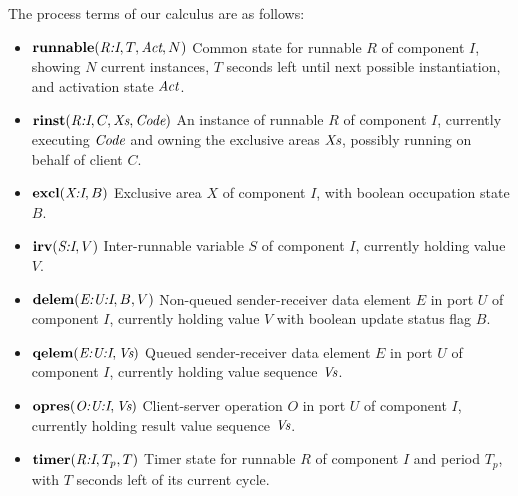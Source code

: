 \documentclass[twocolumn]{article}
\newcommand{\V}[1]{\text{\it #1}}
\newcommand{\Code} {\V{Code}}
\newcommand{\Act}  {\V{Act}}
\newcommand{\Xs}   {\V{Xs}}
\newcommand{\Vs}   {\V{Vs}}
\newcommand{\kw}[1]{\textbf{#1}}
\newcommand{\adr}[1]{\emph{#1}}
\newcommand{\runnable}[4]{\kw{runnable}(#1,#2,#3,#4)}
\newcommand{\rinst}   [4]{\kw{rinst}(#1,#2,#3,#4)}
\newcommand{\excl}    [2]{\kw{excl}(#1,#2)}
\newcommand{\irv}     [2]{\kw{irv}(#1,#2)}
\newcommand{\qelem}   [2]{\kw{qelem}(#1,#2)}
\newcommand{\delem}   [3]{\kw{delem}(#1,#2,#3)}
\newcommand{\opres}   [2]{\kw{opres}(#1,#2)}
\newcommand{\timer}   [3]{\kw{timer}(#1,#2, #3)}
\begin{document}
The process terms of our calculus are as follows:
\begin{itemize}
\item $\runnable{\adr{R:I}}{T}{\Act}{N}$  \newline
Common state for runnable $R$ of component $I$, showing $N$ current instances, $T$ seconds left until next possible instantiation, and activation state $\Act$.
\item $\rinst{\adr{R:I}}{C}{\Xs}{\Code}$ \newline
An instance of runnable $R$ of component $I$, currently executing $\Code$ and owning the exclusive areas $\Xs$, possibly running on behalf of client $C$.
\item $\excl{\adr{X:I}}{B}$ \newline
Exclusive area $X$ of component $I$, with boolean occupation state $B$.
\item $\irv{\adr{S:I}}{V}$ \newline
Inter-runnable variable $S$ of component $I$, currently holding value $V$.
\item $\delem{\adr{E:U:I}}{B}{V}$ \newline
Non-queued sender-receiver data element $E$ in port $U$ of component $I$, currently holding value $V$ with boolean update status flag $B$.
\item $\qelem{\adr{E:U:I}}{\Vs}$ \newline
Queued sender-receiver data element $E$ in port $U$ of component $I$, currently holding value sequence $\Vs$.
\item $\opres{\adr{O:U:I}}{\Vs}$ \newline
Client-server operation $O$ in port $U$ of component $I$, currently holding result value sequence $\Vs$.
\item $\timer{\adr{R:I}}{T_p}{T}$ \newline
Timer state for runnable $R$ of component $I$ and period $T_p$, with $T$ seconds left of its current cycle.
\end{itemize}
\end{document}
